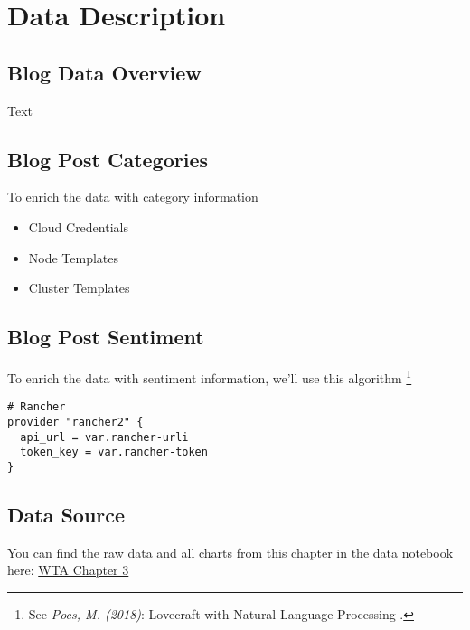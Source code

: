 %
%

\pagebreak
\section{Data Description}

\onehalfspacing

\subsection{Blog Data Overview}

Text

\subsection{Blog Post Categories}

To enrich the data with category information

\begin{itemize}
\item Cloud Credentials
\item Node Templates
\item Cluster Templates
\end{itemize}

\subsection{Blog Post Sentiment}

To enrich the data with sentiment information, we'll use this algorithm \footnote{See \textit{Pocs, M. (2018)}: Lovecraft with Natural Language Processing .\cite{lovecraftAnalysis}}

\begin{lstlisting}[caption=Rancher Provider, frame=single, basicstyle=\ttfamily]
# Rancher
provider "rancher2" {
  api_url = var.rancher-urli
  token_key = var.rancher-token
}
\end{lstlisting}

\subsection{Data Source}

You can find the raw data and all charts from this chapter in the data notebook here: \href{https://plausible.io/chfrank.net}{WTA Chapter 3}
